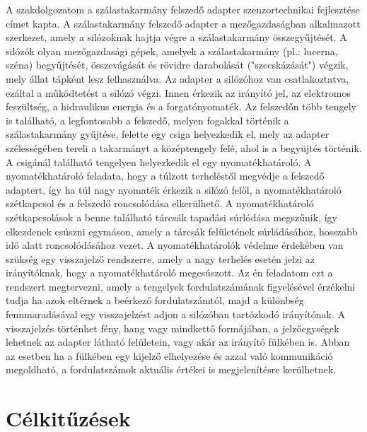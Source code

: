 A szakdolgozatom a szálastakarmány felszedő adapter szenzortechnikai fejlesztése címet kapta. A szálastakarmány felszedő adapter a mezőgazdaságban alkalmazott szerkezet, amely a silózoknak hajtja végre a szálastakarmány összegyűjtését. A silózók olyan mezőgazdasági gépek, amelyek a szálastakarmány (pl.: lucerna, széna) begyűjtését, összevágását és rövidre darabolását ("szecskázását") végzik, mely állat tápként lesz felhasználva. Az adapter a silózóhoz van csatlakoztatva, ezáltal a működtetést a silózó végzi. Innen érkezik az irányító jel, az elektromos feszültség, a hidraulikus energia és a forgatónyomaték. Az felszedőn több tengely is található, a legfontosabb a felszedő, melyen fogakkal történik a szálastakarmány gyűjtése, felette egy csiga helyezkedik el, mely az adapter szélességében tereli a takarmányt a középtengely felé, ahol is a begyüjtés történik. A csigánál található tengelyen helyezkedik el egy nyomatékhatároló. A nyomatékhatároló feladata, hogy a túlzott terheléstől megvédje a felszedő adaptert, így ha túl nagy nyomaték érkezik a silózó felől, a nyomatékhatároló szétkapcsol és a felszedő roncsolódása elkerülhető. A nyomatékhatároló szétkapcsolások a benne található tárcsák tapadási súrlódása megszűnik, így elkezdenek csúszni egymáson, amely a tárcsák felületének súrládásához, hosszabb idő alatt roncsolódásához vezet. A nyomatékhatárolók védelme érdekében van szükség egy visszajelző rendszerre, amely a nagy terhelés esetén jelzi az irányítóknak, hogy a nyomatékhatároló megcsúszott.
Az én feladatom ezt a rendszert megtervezni, amely a tengelyek fordulatszámának figyelésével érzékelni tudja ha azok eltérnek a beérkező fordulatszámtól, majd a különbség fennmaradásával egy visszajelzést adjon a silózóban tartózkodó irányítónak. A visszajelzés történhet fény, hang vagy mindkettő formájában, a jelzőegységek lehetnek az adapter látható felületein, vagy akár az irányító fülkében is. Abban az esetben ha a fülkében egy kijelző elhelyezése és azzal való kommunikáció megoldható, a fordulatszámok aktuális értékei is megjelenítésre kerülhetnek.

\section{Célkitűzések}

